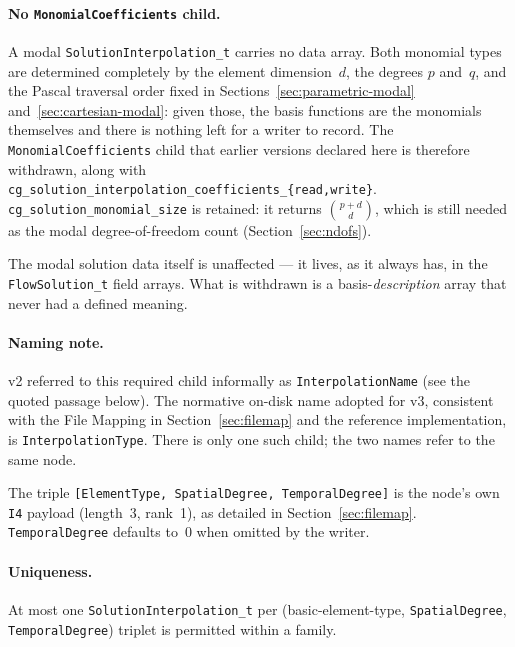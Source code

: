 \documentclass[11pt,letterpaper]{article}
\newif\ifvfourdraft
\newenvironment{v4block}{\ifvfourdraft\color{v4violet}\fi\ignorespaces}{\par}
\newcommand{\vfourmark}{\ifvfourdraft\textcolor{v4violet}{\textbf{[v4]}}\ \fi}
\begin{document}
\begin{v4block}
\paragraph{\vfourmark No \texttt{MonomialCoefficients} child.}
\label{sec:no-monomial-coeff}
A modal \texttt{SolutionInterpolation\_t} carries no data array.  Both monomial
types are determined completely by the element dimension~$d$, the degrees $p$
and~$q$, and the Pascal traversal order fixed in
Sections~\ref{sec:parametric-modal} and~\ref{sec:cartesian-modal}: given those,
the basis functions are the monomials themselves and there is nothing left for a
writer to record.  The \texttt{MonomialCoefficients} child that earlier versions
declared here is therefore withdrawn, along with
\texttt{cg\_solution\_interpolation\_coefficients\_\{read,write\}}.
\texttt{cg\_solution\_monomial\_size} is retained: it returns
$\binom{p+d}{d}$, which is still needed as the modal degree-of-freedom count
(Section~\ref{sec:ndofs}).

The modal solution data itself is unaffected --- it lives, as it always has, in
the \texttt{FlowSolution\_t} field arrays.  What is withdrawn is a
basis-\emph{description} array that never had a defined meaning.
\end{v4block}

\paragraph{Naming note.}
v2 referred to this required child informally as \texttt{InterpolationName}
(see the quoted passage below).  The normative on-disk name adopted for v3,
consistent with the File Mapping in Section~\ref{sec:filemap} and the
reference implementation, is \texttt{InterpolationType}.  There is only one
such child; the two names refer to the same node.

\noindent The triple \texttt{[ElementType, SpatialDegree, TemporalDegree]} is the
node's own \texttt{I4} payload (length~3, rank~1), as detailed in
Section~\ref{sec:filemap}.  \texttt{TemporalDegree} defaults to~0 when omitted by
the writer.

\paragraph{Uniqueness.}
At most one \texttt{SolutionInterpolation\_t} per (basic-element-type,
\texttt{SpatialDegree}, \texttt{TemporalDegree}) triplet is permitted within a family.
\end{document}
